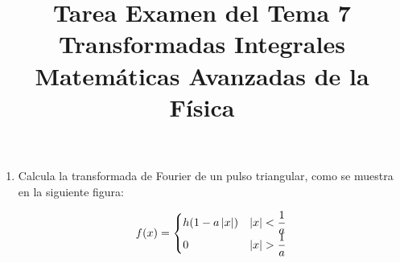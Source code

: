 
\author{}
\title{Tarea Examen del Tema 7  \\ \large{Transformadas Integrales\\ Matemáticas Avanzadas de la Física}} \vspace{-1.5\baselineskip}
\date{ }

\vspace{-4cm}
\renewcommand\labelenumii{\theenumi.{\arabic{enumii})}}
\maketitle
\fontsize{14}{14}\selectfont
\begin{enumerate}
\item Calcula la transformada de Fourier de un pulso triangular, como se muestra en la siguiente figura:
\begin{figure}[H]
    \centering
    
\end{figure}
\begin{align*}
f(x) = \begin{cases}
h(1 - a \, \abs{x}) & \abs{x} < \dfrac{1}{a} \\
0 & \abs{x} > \dfrac{1}{a}
\end{cases}
\end{align*}
\end{enumerate}
